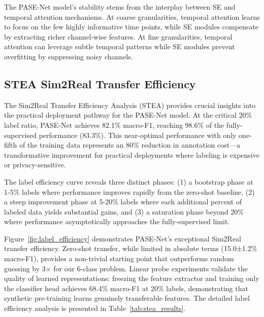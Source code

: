 \documentclass[journal]{IEEEtran}
\begin{document}
The PASE-Net model's stability stems from the interplay between SE and temporal attention mechanisms. At coarse granularities, temporal attention learns to focus on the few highly informative time points, while SE modules compensate by extracting richer channel-wise features. At fine granularities, temporal attention can leverage subtle temporal patterns while SE modules prevent overfitting by suppressing noisy channels.

\subsection{STEA Sim2Real Transfer Efficiency}

The Sim2Real Transfer Efficiency Analysis (STEA) provides crucial insights into the practical deployment pathway for the PASE-Net model. At the critical 20\% label ratio, PASE-Net achieves 82.1\% macro-F1, reaching 98.6\% of the fully-supervised performance (83.3\%). This near-optimal performance with only one-fifth of the training data represents an 80\% reduction in annotation cost—a transformative improvement for practical deployments where labeling is expensive or privacy-sensitive.

The label efficiency curve reveals three distinct phases: (1) a bootstrap phase at 1-5\% labels where performance improves rapidly from the zero-shot baseline, (2) a steep improvement phase at 5-20\% labels where each additional percent of labeled data yields substantial gains, and (3) a saturation phase beyond 20\% where performance asymptotically approaches the fully-supervised limit.

Figure~\ref{fig:label_efficiency} demonstrates PASE-Net's exceptional Sim2Real transfer efficiency. Zero-shot transfer, while limited in absolute terms (15.0±1.2\% macro-F1), provides a non-trivial starting point that outperforms random guessing by 3× for our 6-class problem. Linear probe experiments validate the quality of learned representations: freezing the feature extractor and training only the classifier head achieves 68.4\% macro-F1 at 20\% labels, demonstrating that synthetic pre-training learns genuinely transferable features. The detailed label efficiency analysis is presented in Table~\ref{tab:stea_results}.
\end{document}
